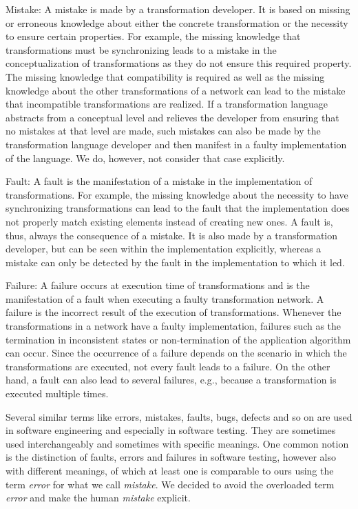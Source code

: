 \begin{properdescription}
    \item[Mistake:] 
    A mistake is made by a transformation developer. It is based on missing or erroneous knowledge about either the concrete transformation or the necessity to ensure certain properties. For example, the missing knowledge that transformations must be synchronizing leads to a mistake in the conceptualization of transformations as they do not ensure this required property. The missing knowledge that compatibility is required as well as the missing knowledge about the other transformations of a network can lead to the mistake that incompatible transformations are realized.
    If a transformation language abstracts from a conceptual level and relieves the developer from ensuring that no mistakes at that level are made, such mistakes can also be made by the transformation language developer and then manifest in a faulty implementation of the language. We do, however, not consider that case explicitly. 
    \item[Fault:] 
    A fault is the manifestation of a mistake in the implementation of transformations. For example, the missing knowledge about the necessity to have synchronizing transformations can lead to the fault that the implementation does not properly match existing elements instead of creating new ones. A fault is, thus, always the consequence of a mistake. It is also made by a transformation developer, but can be seen within the implementation explicitly, whereas a mistake can only be detected by the fault in the implementation to which it led.
    \item[Failure:] 
    A failure occurs at execution time of transformations and is the manifestation of a fault when executing a faulty transformation network. A failure is the incorrect result of the execution of transformations. Whenever the transformations in a network have a faulty implementation, failures such as the termination in inconsistent states or non-termination of the application algorithm can occur. Since the occurrence of a failure depends on the scenario in which the transformations are executed, not every fault leads to a failure. On the other hand, a fault can also lead to several failures, e.g., because a transformation is executed multiple times.
\end{properdescription}

Several similar terms like errors, mistakes, faults, bugs, defects and so on are used in software engineering and especially in software testing.
They are sometimes used interchangeably and sometimes with specific meanings.
One common notion is the distinction of faults, errors and failures in software testing, however also with different meanings, of which at least one is comparable to ours using the term \emph{error} for what we call \emph{mistake}.
We decided to avoid the overloaded term \emph{error} and make the human \emph{mistake} explicit.


